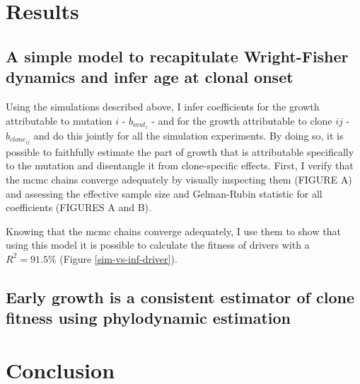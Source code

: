 \section{Results}

\subsection{A simple model to recapitulate Wright-Fisher dynamics and infer age at clonal onset}

Using the simulations described above, I infer coefficients for the growth attributable to mutation $i$ - $b_{mut_i}$ - and for the growth attributable to clone $ij$ - $b_{clone_{ij}}$ and do this jointly for all the simulation experiments. By doing so, it is possible to faithfully estimate the part of growth that is attributable specifically to the mutation and disentangle it from clone-specific effects. First, I verify that the \ac{mcmc} chains converge adequately by visually inspecting them (FIGURE A) and assessing the effective sample size and Gelman-Rubin statistic for all coefficients (FIGURES A and B). 

Knowing that the \ac{mcmc} chains converge adequately, I use them to show that using this model it is possible to calculate the fitness of drivers with a $R^2 = 91.5\%$ (Figure \ref{sim-vs-inf-driver}). 

\begin{figure}
	\label{fig:sim-vs-inf-driver}
\end{figure}

\subsection{}

\subsection{Early growth is a consistent estimator of clone fitness using phylodynamic estimation}

\section{Conclusion}